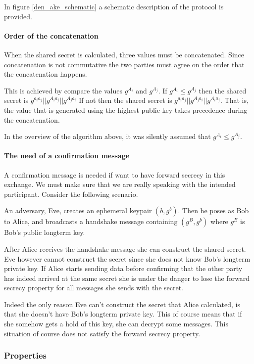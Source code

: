 \documentclass[12pt,titlepage,a4paper]{article}
\begin{document}
{In figure \ref{den_ake_schematic} a schematic description of the protocol is provided.

\paragraph{Order of the concatenation}
When the shared secret is calculated, three values must be concatenated. Since
concatenation is not commutative the two parties must agree on the order that the
concatenation happens.

This is achieved by compare the values $g^{A_i}$ and $g^{A_j}$. If
$g^{A_i} \le g^{A_j}$ then the shared secret is $g^{a_ia_j} || g^{A_ia_j} || g^{A_ja_i}$
If not then the shared secret is $g^{a_ia_j} || g^{A_ja_i} || g^{A_ia_j}$. That is, the
value that is generated using the highest public key takes precedence during the
concatenation.

In the overview of the algorithm above, it was silently assumed that
$g^{A_i} \le g^{A_j}$.

\paragraph{The need of a confirmation message}
\label{confirm_message_explain}
A confirmation message is needed if want to have forward secrecy in this exchange.
We must make sure that we are really speaking with the intended participant. Consider
the following scenario.

An adversary, Eve, creates an ephemeral keypair $(b, g^b)$. Then he poses as Bob to Alice,
and broadcasts a handshake message containing $(g^B,g^b)$ where $g^B$ is Bob's
public longterm key.

After Alice receives the handshake message she can construct the shared secret. Eve
however cannot construct the secret since she does not know Bob's longterm
private key. If Alice starts sending data before confirming that the other party
has indeed arrived at the same secret she is under the danger to lose the forward
secrecy property for all messages she sends with the secret.

Indeed the only reason Eve can't construct the secret that Alice calculated, is
that she doesn't have Bob's longterm private key. This of course means that if
she somehow gets a hold of this key, she can decrypt some messages. This situation
of course does not satisfy the forward secrecy property.


\subsubsection{Properties}

}
\end{document}
